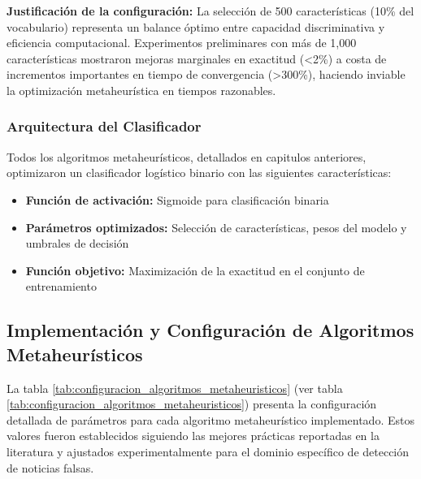 \textbf{Justificación de la configuración:} La selección de 500 características (10\% del vocabulario) representa un balance óptimo entre capacidad discriminativa y eficiencia computacional. Experimentos preliminares con más de 1,000 características mostraron mejoras marginales en exactitud (<2\%) a costa de incrementos importantes en tiempo de convergencia (>300\%), haciendo inviable la optimización metaheurística en tiempos razonables.

\subsubsection{Arquitectura del Clasificador}

Todos los algoritmos metaheurísticos, detallados en capitulos anteriores, optimizaron un clasificador logístico binario con las siguientes características:

\begin{itemize}
    \item \textbf{Función de activación:} Sigmoide para clasificación binaria
    \item \textbf{Parámetros optimizados:} Selección de características, pesos del modelo y umbrales de decisión
    \item \textbf{Función objetivo:} Maximización de la exactitud en el conjunto de entrenamiento
\end{itemize}

\subsection{Implementación y Configuración de Algoritmos Metaheurísticos}
\label{subsec:implementacion_algoritmos}

La tabla \ref{tab:configuracion_algoritmos_metaheuristicos} (ver tabla \ref{tab:configuracion_algoritmos_metaheuristicos}) presenta la configuración detallada de parámetros para cada algoritmo metaheurístico implementado. Estos valores fueron establecidos siguiendo las mejores prácticas reportadas en la literatura y ajustados experimentalmente para el dominio específico de detección de noticias falsas.

